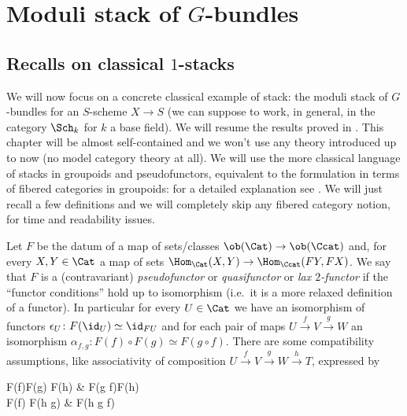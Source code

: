 \chapter{\texorpdfstring{Moduli stack of $G$-bundles}{Moduli stack of bundles}}
    \label{chapter:moduli_stack_bung}
    \section{\texorpdfstring{Recalls on classical $1$-stacks}{Recalls on classical stacks}}
        We will now focus on a concrete classical example of stack: the moduli stack of $G$-bundles for an $S$-scheme $X \to S$ (we can suppose to work, in general, in the category $\Sch_k$ for $k$ a base field). We will resume the results proved in \cite{wang:moduli}. This chapter will be almost self-contained and we won't use any theory introduced up to now (no model category theory at all). We will use the more classical language of stacks in groupoids and pseudofunctors, equivalent to the formulation in terms of fibered categories in groupoids: for a detailed explanation see \cite{Vist:desc}. We will just recall a few definitions and we will completely skip any fibered category notion, for time and readability issues.
       
        \begin{defn}
            \label{defn:pseudofunctor}
            Let $F$ be the datum of a map of sets/classes $\ob(\Cat) \to \ob(\Ccat)$ and, for every $X, Y \in \Cat$ a map of sets $\Hom_{\Cat}(X, Y) \to \Hom_{\Ccat}(FY, FX)$. We say that $F$ is a (contravariant) \emph{pseudofunctor} or \emph{quasifunctor} or \emph{lax $2$-functor} if the ``functor conditions'' hold up to isomorphism (i.e.\ it is a more relaxed definition of a functor). In particular for every $U \in \Cat$ we have an isomorphism of functors $\epsilon_U\colon F(\id_U) \simeq \id_{FU}$ and for each pair of maps $U \stackrel{f}{\to} V \stackrel{g}{\to} W$ an isomorphism $\alpha_{f,g}\colon F(f) \circ F(g) \simeq F(g \circ f)$. There are some compatibility assumptions, like associativity of composition $U \stackrel{f}{\to} V \stackrel{g}{\to} W \stackrel{h}{\to} T$, expressed by 
            \begin{diag}
                F(f)\circ F(g) \circ F(h) \ar[r, "\alpha_{f,g}(F(h))"] \ar[d, "F(f)\alpha_{g,h}"] & F(g \circ f)\circ F(h)  \\
                F(f) \circ F(h \circ g)   & F(h \circ g \circ f)
            \end{diag}
        \end{defn}


